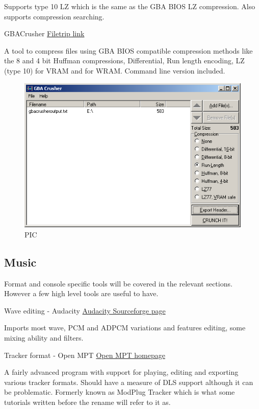 \documentclass[
]{book}
\begin{document}
Supports type 10 LZ which is the same as the GBA BIOS LZ compression. Also supports compression searching.

GBACrusher \href{http://filetrip.net/gba-downloads/tools-utilities/download-gba-crusher-010-f28823.html}{Filetrip link}

A tool to compress files using GBA BIOS compatible compression methods like the 8 and 4 bit Huffman compressions, Differential, Run length encoding, LZ (type 10) for VRAM and for WRAM. Command line version included.

\begin{figure}
\centering
\includegraphics{images/16_home_fast6191_romhackingguide_unrenamed_file___hackingguidecompressionshowcasegbacrusher_1.png}
\caption{PIC}
\end{figure}

\hypertarget{music}{%
\subsection{Music}\label{music}}

Format and console specific tools will be covered in the relevant sections. However a few high level tools are useful to have.

Wave editing - Audacity \href{http://audacity.sourceforge.net/}{Audacity Sourceforge page}

Imports most wave, PCM and ADPCM variations and features editing, some mixing ability and filters.

Tracker format - Open MPT \href{http://openmpt.org/}{Open MPT homepage}

A fairly advanced program with support for playing, editing and exporting various tracker formats. Should have a measure of DLS support although it can be problematic. Formerly known as ModPlug Tracker which is what some tutorials written before the rename will refer to it as.
\end{document}
